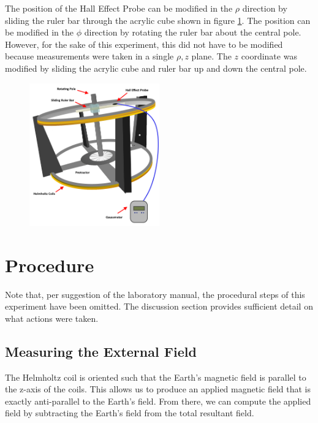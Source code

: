 \documentclass[a4paper]{article}
\begin{document}

\qq The position of the Hall Effect Probe can be modified in the $\rho$ direction by
sliding the ruler bar through the acrylic cube shown in figure
\ref{helmholtz_diagram}. The position can be modified in the $\phi$ direction by
rotating the ruler bar about the central pole. However, for the sake of this
experiment, this did not have to be modified because measurements were taken in
a single $\rho , z$ plane. The $z$ coordinate was modified by sliding the
acrylic cube and ruler bar up and down the central pole.


\begin{figure}[H]
\centering
\includegraphics[width=0.5\textwidth]{helmholtz_diagram.png}

\label{helmholtz_diagram}
\end{figure}

\section{Procedure}


\qq Note that, per suggestion of the laboratory manual, the procedural steps of this
experiment have been omitted. The discussion section provides sufficient detail
on what actions were taken.

\subsection{Measuring the External Field}
\qq The Helmholtz coil is oriented such that the Earth's magnetic field is parallel
to the z-axis of the coils. This allows us to produce an applied magnetic field
that is exactly anti-parallel to the Earth's field. From there, we can compute
the applied field by subtracting the Earth's field from the total resultant
field.
\end{document}
